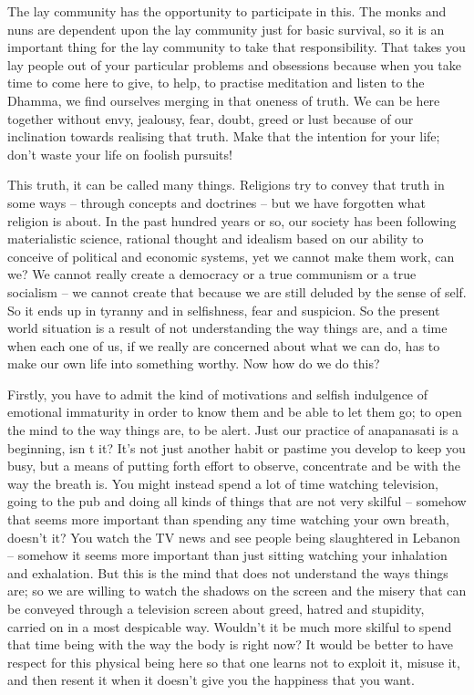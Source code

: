 The lay community has the opportunity to participate in this. The monks and nuns are dependent upon the lay community just for basic survival, so it is an important thing for the lay community to take that responsibility. That takes you lay people out of your particular problems and obsessions because when you take time to come here to give, to help, to practise meditation and listen to the Dhamma, we find ourselves merging in that oneness of truth. We can be here together without envy, jealousy, fear, doubt, greed or lust because of our inclination towards realising that truth. Make that the intention for your life; don't waste your life on foolish pursuits!

This truth, it can be called many things. Religions try to convey that truth in some ways -- through concepts and doctrines -- but we have forgotten what religion is about. In the past hundred years or so, our society has been following materialistic science, rational thought and idealism based on our ability to conceive of political and economic systems, yet we cannot make them work, can we? We cannot really create a democracy or a true communism or a true socialism -- we cannot create that because we are still deluded by the sense of self. So it ends up in tyranny and in selfishness, fear and suspicion. So the present world situation is a result of not understanding the way things are, and a time when each one of us, if we really are concerned about what we can do, has to make our own life into something worthy. Now how do we do this?

Firstly, you have to admit the kind of motivations and selfish indulgence of emotional immaturity in order to know them and be able to let them go; to open the mind to the way things are, to be alert. Just our practice of anapanasati is a beginning, isn t it? It's not just another habit or pastime you develop to keep you busy, but a means of putting forth effort to observe, concentrate and be with the way the breath is. You might instead spend a lot of time watching television, going to the pub and doing all kinds of things that are not very skilful -- somehow that seems more important than spending any time watching your own breath, doesn't it? You watch the TV news and see people being slaughtered in Lebanon -- somehow it seems more important than just sitting watching your inhalation and exhalation. But this is the mind that does not understand the ways things are; so we are willing to watch the shadows on the screen and the misery that can be conveyed through a television screen about greed, hatred and stupidity, carried on in a most despicable way. Wouldn't it be much more skilful to spend that time being with the way the body is right now? It would be better to have respect for this physical being here so that one learns not to exploit it, misuse it, and then resent it when it doesn't give you the happiness that you want.

